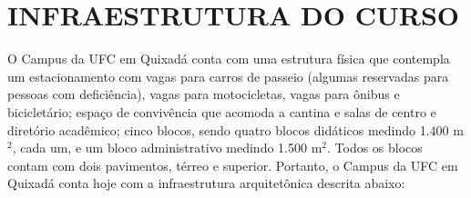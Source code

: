 \chapter{INFRAESTRUTURA DO CURSO}
\label{cap:infraestrutura-do-curso}

\def\ufcNumEquipEletro{266\xspace}
\def\ufcNumNotebooks{28\xspace}
\def\ufcNumProjetores{33\xspace}
\def\ufcNumDesktops{213\xspace}
\def\ufcNumServidores{6\xspace}
\def\ufcNumVoip{16\xspace}
\def\ufcNumNobreaks{3\xspace}
\def\ufcNumLab{sete\xspace}
\def\ufcNumGabinetes{35\xspace}
\def\ufcNumDocentes{59\xspace}
\def\ufcNumDocSubstitutos{1\xspace}
\def\ufcNumDocQuarentaHoras{1\xspace}
\def\ufcNumDocDE{57\xspace}
\def\ufcDocMestres{14\xspace}
\def\ufcDocDoutores{45\xspace}
\def\ufcDocDoutorandos{7\xspace}
\def\ufcDocAfasDoutorado{1\xspace}
\def\ufcNumSTA{29\xspace}
\def\ufcNumSTAMedio{13\xspace}
\def\ufcNumSTASuperior{16\xspace}
\def\ufcSTAEscMedio{2\xspace}
\def\ufcSTAEscGrad{10\xspace}
\def\ufcSTAEscEspec{12\xspace}
\def\ufcSTAEscMestre{5\xspace}
\def\ufcBCQAnoReferencia{2025\xspace}
\def\ufcBCQTitulos{1.425\xspace}
\def\ufcBCQExemplares{9.524\xspace}
\def\ufcBCQDocsRepositorio{74 mil\xspace}



O Campus da UFC em Quixadá conta com uma estrutura física que contempla um estacionamento com vagas para carros de passeio (algumas reservadas para pessoas com deficiência), vagas para motocicletas, vagas para ônibus e bicicletário; espaço de convivência que acomoda a cantina e salas de centro e diretório acadêmico; cinco blocos, sendo quatro blocos didáticos medindo 1.400 m$^2$, cada um, e um bloco administrativo medindo 1.500 m$^2$. Todos os blocos contam com dois pavimentos, térreo e superior. Portanto, o Campus da UFC em Quixadá conta hoje com a infraestrutura arquitetônica descrita abaixo:%

